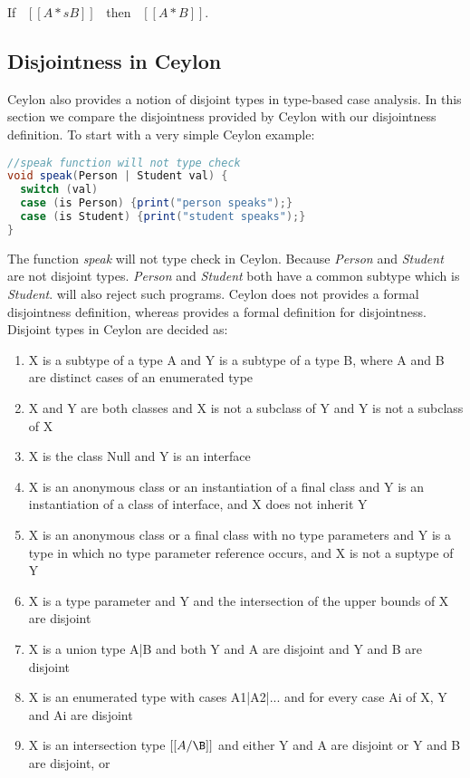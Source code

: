\begin{lemma}
  If \ $[[A *s B]]$ \ then \ $[[A * B]]$.
\label{lemma:inter:disj-complete}
\end{lemma}


\subsection{Disjointness in Ceylon}
\label{sec:inter:ceylon}
Ceylon also provides a notion of disjoint types in type-based case analysis. In this section
we compare the disjointness provided by Ceylon with our disjointness definition.
To start with a very simple Ceylon example:

\begin{lstlisting}[language=Java]
//speak function will not type check
void speak(Person | Student val) {
  switch (val)
  case (is Person) {print("person speaks");}
  case (is Student) {print("student speaks");} 
}
\end{lstlisting}

\noindent The function \emph{speak} will not type check in Ceylon. Because \emph{Person} and
\emph{Student} are not disjoint types. \emph{Person} and \emph{Student} both have a common
subtype which is \emph{Student}. \cal will also reject such programs. Ceylon does not provides
a formal disjointness definition, whereas \cal provides a formal definition for
disjointness. Disjoint types in Ceylon are decided as:

\begin{enumerate}
  \item{X is a subtype of a type A and Y is a subtype of a type B, where A and B are distinct cases of an enumerated type}
  \item{X and Y are both classes and X is not a subclass of Y and Y is not a subclass of X}
  \item{X is the class Null and Y is an interface}
  \item{X is an anonymous class or an instantiation of a final class and Y is an instantiation of a class of interface, and X does not inherit Y}
  \item{X is an anonymous class or a final class with no type parameters and Y is a type in which no type parameter reference occurs, and X is not a suptype of Y}
  \item{X is a type parameter and Y and the intersection of the upper bounds of X are disjoint}
  \item{X is a union type A|B and both Y and A are disjoint and Y and B are disjoint}
  \item{X is an enumerated type with cases A1|A2|... and for every case Ai of X, Y and Ai are disjoint}
  \item{X is an intersection type $[[A/\B]]$ and either Y and A are disjoint or Y and B are disjoint, or}
\end{enumerate}